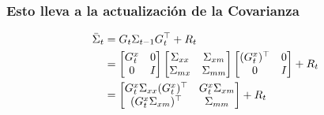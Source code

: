 \begin{frame}
    \frametitle{Esto lleva a la actualización de la Covarianza}

    \begin{align*}
        \bar{\Sigma}_t &= G_t \Sigma_{t-1} G_t^{\top} + R_t \\
        &= 
        \begin{bmatrix}
        G_{t}^{x} & 0 \\
        0 & I
        \end{bmatrix}
        \begin{bmatrix}
        \Sigma_{xx} & \Sigma_{xm} \\
        \Sigma_{mx} & \Sigma_{mm}
        \end{bmatrix}
        \begin{bmatrix}
        (G_{t}^{x})^{\top} & 0 \\
        0 & I
        \end{bmatrix}
        + R_t \\
        &=
        \begin{bmatrix}
        G_{t}^{x} \Sigma_{xx} (G_{t}^{x})^{\top} & G_{t}^{x} \Sigma_{xm} \\
        (G_{t}^{x} \Sigma_{xm})^{\top} & \Sigma_{mm}
        \end{bmatrix}
        + R_t
    \end{align*}

\end{frame}

